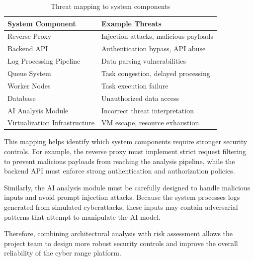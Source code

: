 \begin{table}[H]
    \centering
    \renewcommand{\arraystretch}{1.2}
    \begin{tabularx}{\textwidth}{|X|X|}
        \hline
        \textbf{System Component} & \textbf{Example Threats} \\
        \hline
        Reverse Proxy & Injection attacks, malicious payloads \\
        \hline
        Backend API & Authentication bypass, API abuse \\
        \hline
        Log Processing Pipeline & Data parsing vulnerabilities \\
        \hline
        Queue System & Task congestion, delayed processing \\
        \hline
        Worker Nodes & Task execution failure \\
        \hline
        Database & Unauthorized data access \\
        \hline
        AI Analysis Module & Incorrect threat interpretation \\
        \hline
        Virtualization Infrastructure & VM escape, resource exhaustion \\
        \hline
    \end{tabularx}
    \caption{Threat mapping to system components}
\end{table}

This mapping helps identify which system components require stronger security controls. For example, the reverse proxy must implement strict request filtering to prevent malicious payloads from reaching the analysis pipeline, while the backend API must enforce strong authentication and authorization policies.

Similarly, the AI analysis module must be carefully designed to handle malicious inputs and avoid prompt injection attacks. Because the system processes logs generated from simulated cyberattacks, these inputs may contain adversarial patterns that attempt to manipulate the AI model.

Therefore, combining architectural analysis with risk assessment allows the project team to design more robust security controls and improve the overall reliability of the cyber range platform.

